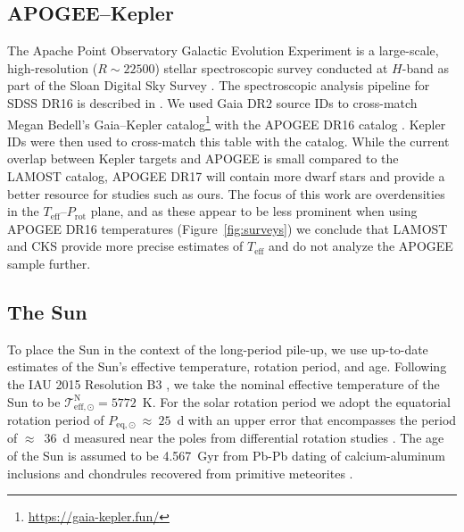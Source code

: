 \documentclass[linenumbers,tighten,trackchanges,twocolumn]{aastex631}
\newcommand{\teff}{\ensuremath{T_{\mathrm{eff}}}\xspace}
\newcommand{\logg}{\ensuremath{\log g}\xspace}
\newcommand{\prot}{\ensuremath{P_\mathrm{rot}}\xspace}
\begin{document}

\subsection{APOGEE--Kepler}
The Apache Point Observatory Galactic Evolution Experiment \citep[APOGEE;][]{Majewski2017} is a large-scale, high-resolution ($R \sim 22500$) stellar spectroscopic survey conducted at $H$-band as part of the Sloan Digital Sky Survey \citep[SDSS-IV;][]{Blanton2017}. The spectroscopic analysis pipeline for SDSS DR16 is described in \citet{Jonsson2020}. We used Gaia DR2 source IDs \citep{Gaia2016, Gaia2018} to cross-match Megan Bedell's Gaia--Kepler catalog\footnote{\url{https://gaia-kepler.fun/}} with the APOGEE DR16 catalog \citep{Ahumada2020}. Kepler IDs were then used to cross-match this table with the \citet{McQuillan2014} catalog. While the current overlap between Kepler targets and APOGEE is small compared to the LAMOST catalog, APOGEE DR17 will contain more dwarf stars and provide a better resource for studies such as ours. The focus of this work are overdensities in the \teff--\prot plane, and as these appear to be less prominent when using  APOGEE DR16 temperatures (Figure~\ref{fig:surveys}) we conclude that LAMOST and CKS provide more precise estimates of \teff and do not analyze the APOGEE sample further. 

\subsection{The Sun}
To place the Sun in the context of the long-period pile-up, we use up-to-date estimates of the Sun's effective temperature, rotation period, and age. Following the IAU 2015 Resolution B3 \citep{Prsa2016}, we take the nominal effective temperature of the Sun to be $\mathcal{T}^\mathrm{N}_\mathrm{eff,\odot} = 5772$~K. For the solar rotation period we adopt the equatorial rotation period of $P_\mathrm{eq,\odot}~\approx~25$~d with an upper error that encompasses the period of $\approx$~36~d measured near the poles from differential rotation studies \citep[][and references therein]{Thompson2003}.  The age of the Sun is assumed to be 4.567~Gyr from Pb-Pb dating of calcium-aluminum inclusions and chondrules recovered from primitive meteorites \citep[][and references therein]{Bahcall1995}.
\end{document}
